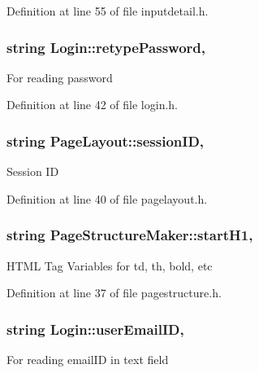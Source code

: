 Definition at line 55 of file inputdetail.\-h.

\hypertarget{classLogin_ade36f8943aafce470ef4b8353c79b2c6}{
\subsubsection[{retype\-Password}]{\setlength{\rightskip}{0pt plus 5cm}string Login\-::retype\-Password\hspace{0.3cm}{\ttfamily [protected]}, {\ttfamily [inherited]}}}\label{classLogin_ade36f8943aafce470ef4b8353c79b2c6}
For reading password 

Definition at line 42 of file login.\-h.

\hypertarget{classPageLayout_ab796c4a12a3f9c089881085e508e2a1c}{
\subsubsection[{session\-I\-D}]{\setlength{\rightskip}{0pt plus 5cm}string Page\-Layout\-::session\-I\-D\hspace{0.3cm}{\ttfamily [protected]}, {\ttfamily [inherited]}}}\label{classPageLayout_ab796c4a12a3f9c089881085e508e2a1c}
Session I\-D 

Definition at line 40 of file pagelayout.\-h.

\hypertarget{classPageStructureMaker_af41d4e21b808f5f8dc2c727f775b6fb2}{
\subsubsection[{start\-H1}]{\setlength{\rightskip}{0pt plus 5cm}string Page\-Structure\-Maker\-::start\-H1\hspace{0.3cm}{\ttfamily [protected]}, {\ttfamily [inherited]}}}\label{classPageStructureMaker_af41d4e21b808f5f8dc2c727f775b6fb2}
H\-T\-M\-L Tag Variables for td, th, bold, etc 

Definition at line 37 of file pagestructure.\-h.

\hypertarget{classLogin_aa83b4706e0f0f0afc65f210ee8e4839a}{
\subsubsection[{user\-Email\-I\-D}]{\setlength{\rightskip}{0pt plus 5cm}string Login\-::user\-Email\-I\-D\hspace{0.3cm}{\ttfamily [protected]}, {\ttfamily [inherited]}}}\label{classLogin_aa83b4706e0f0f0afc65f210ee8e4839a}
For reading email\-I\-D in text field 

